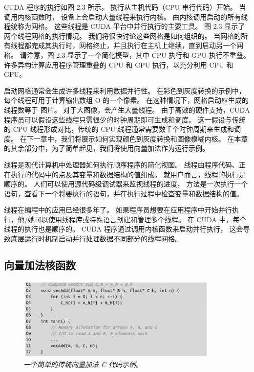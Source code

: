 CUDA 程序的执行如图 2.3 所示。 执行从主机代码（CPU 串行代码）开始。 当调用内核函数时，
设备上会启动大量线程来执行内核。 由内核调用启动的所有线程统称为网格。 这些线程是 CUDA 平台中并行执行的主要工具。 
图 2.3 显示了两个线程网格的执行情况。 我们将很快讨论这些网格是如何组织的。 
当网格的所有线程都完成其执行时，网格终止，并且执行在主机上继续，直到启动另一个网格。 
请注意，图 2.3 显示了一个简化模型，其中 CPU 执行和 GPU 执行不重叠。 
许多异构计算应用程序管理重叠的 CPU 和 GPU 执行，以充分利用 CPU 和 GPU。

启动网格通常会生成许多线程来利用数据并行性。 在彩色到灰度转换的示例中，每个线程可用于计算输出数组 O 的一个像素。
在这种情况下，网格启动应生成的线程数等于 图片。 对于大图像，会产生大量线程。 
由于高效的硬件支持，CUDA 程序员可以假设这些线程只需很少的时钟周期即可生成和调度。 
这一假设与传统的 CPU 线程形成对比，传统的 CPU 线程通常需要数千个时钟周期来生成和调度。 
在下一章中，我们将展示如何实现颜色到灰度转换和图像模糊内核。 
在本章的其余部分中，为了简单起见，我们将使用向量加法作为运行示例。

\begin{remark}[线程]
线程是现代计算机中处理器如何执行顺序程序的简化视图。 线程由程序代码、正在执行的代码中的点及其变量和数据结构的值组成。 
就用户而言，线程的执行是顺序的。 人们可以使用源代码级调试器来监视线程的进度，
方法是一次执行一个语句，查看下一个将要执行的语句，并在执行过程中检查变量和数据结构的值。

线程在编程中的应用已经很多年了。 如果程序员想要在应用程序中开始并行执行，他/她可以使用线程库或特殊语言创建和管理多个线程。 
在 CUDA 中，每个线程的执行也是顺序的。 CUDA 程序通过调用内核函数来启动并行执行，
这会导致底层运行时机制启动并行处理数据不同部分的线程网格。
\end{remark}

\subsection{向量加法核函数}
\begin{figure}[H]
	\centering
	\includegraphics[width=0.9\textwidth]{figs/F2.4.png}
	\caption{\textit{一个简单的传统向量加法 C 代码示例。}}
\end{figure}


